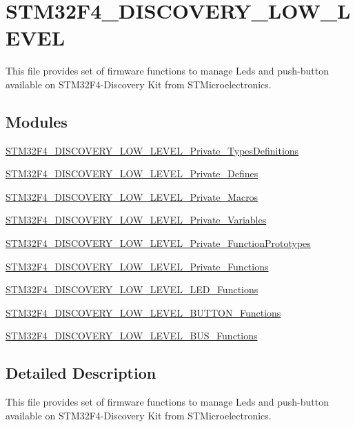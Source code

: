 \hypertarget{group__STM32F4__DISCOVERY__LOW__LEVEL}{\section{S\-T\-M32\-F4\-\_\-\-D\-I\-S\-C\-O\-V\-E\-R\-Y\-\_\-\-L\-O\-W\-\_\-\-L\-E\-V\-E\-L}
\label{group__STM32F4__DISCOVERY__LOW__LEVEL}
}


This file provides set of firmware functions to manage Leds and push-\/button available on S\-T\-M32\-F4-\/\-Discovery Kit from S\-T\-Microelectronics.  


\subsection*{Modules}
\begin{DoxyCompactItemize}
\item 
\hyperlink{group__STM32F4__DISCOVERY__LOW__LEVEL__Private__TypesDefinitions}{S\-T\-M32\-F4\-\_\-\-D\-I\-S\-C\-O\-V\-E\-R\-Y\-\_\-\-L\-O\-W\-\_\-\-L\-E\-V\-E\-L\-\_\-\-Private\-\_\-\-Types\-Definitions}
\item 
\hyperlink{group__STM32F4__DISCOVERY__LOW__LEVEL__Private__Defines}{S\-T\-M32\-F4\-\_\-\-D\-I\-S\-C\-O\-V\-E\-R\-Y\-\_\-\-L\-O\-W\-\_\-\-L\-E\-V\-E\-L\-\_\-\-Private\-\_\-\-Defines}
\item 
\hyperlink{group__STM32F4__DISCOVERY__LOW__LEVEL__Private__Macros}{S\-T\-M32\-F4\-\_\-\-D\-I\-S\-C\-O\-V\-E\-R\-Y\-\_\-\-L\-O\-W\-\_\-\-L\-E\-V\-E\-L\-\_\-\-Private\-\_\-\-Macros}
\item 
\hyperlink{group__STM32F4__DISCOVERY__LOW__LEVEL__Private__Variables}{S\-T\-M32\-F4\-\_\-\-D\-I\-S\-C\-O\-V\-E\-R\-Y\-\_\-\-L\-O\-W\-\_\-\-L\-E\-V\-E\-L\-\_\-\-Private\-\_\-\-Variables}
\item 
\hyperlink{group__STM32F4__DISCOVERY__LOW__LEVEL__Private__FunctionPrototypes}{S\-T\-M32\-F4\-\_\-\-D\-I\-S\-C\-O\-V\-E\-R\-Y\-\_\-\-L\-O\-W\-\_\-\-L\-E\-V\-E\-L\-\_\-\-Private\-\_\-\-Function\-Prototypes}
\item 
\hyperlink{group__STM32F4__DISCOVERY__LOW__LEVEL__Private__Functions}{S\-T\-M32\-F4\-\_\-\-D\-I\-S\-C\-O\-V\-E\-R\-Y\-\_\-\-L\-O\-W\-\_\-\-L\-E\-V\-E\-L\-\_\-\-Private\-\_\-\-Functions}
\item 
\hyperlink{group__STM32F4__DISCOVERY__LOW__LEVEL__LED__Functions}{S\-T\-M32\-F4\-\_\-\-D\-I\-S\-C\-O\-V\-E\-R\-Y\-\_\-\-L\-O\-W\-\_\-\-L\-E\-V\-E\-L\-\_\-\-L\-E\-D\-\_\-\-Functions}
\item 
\hyperlink{group__STM32F4__DISCOVERY__LOW__LEVEL__BUTTON__Functions}{S\-T\-M32\-F4\-\_\-\-D\-I\-S\-C\-O\-V\-E\-R\-Y\-\_\-\-L\-O\-W\-\_\-\-L\-E\-V\-E\-L\-\_\-\-B\-U\-T\-T\-O\-N\-\_\-\-Functions}
\item 
\hyperlink{group__STM32F4__DISCOVERY__LOW__LEVEL__BUS__Functions}{S\-T\-M32\-F4\-\_\-\-D\-I\-S\-C\-O\-V\-E\-R\-Y\-\_\-\-L\-O\-W\-\_\-\-L\-E\-V\-E\-L\-\_\-\-B\-U\-S\-\_\-\-Functions}
\end{DoxyCompactItemize}


\subsection{Detailed Description}
This file provides set of firmware functions to manage Leds and push-\/button available on S\-T\-M32\-F4-\/\-Discovery Kit from S\-T\-Microelectronics. 